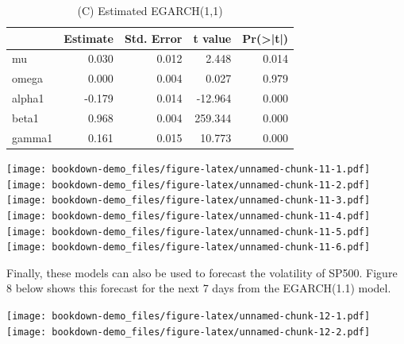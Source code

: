 \documentclass[]{book}
\theoremstyle{definition}
\theoremstyle{definition}
\theoremstyle{definition}
\theoremstyle{remark}
\begin{document}
\begin{table}

\caption{\label{tab:unnamed-chunk-11}(C) Estimated EGARCH(1,1)}
\centering
\begin{tabular}[t]{l|r|r|r|r}
\hline
  &  Estimate &  Std. Error &  t value & Pr(>|t|)\\
\hline
mu & 0.030 & 0.012 & 2.448 & 0.014\\
\hline
omega & 0.000 & 0.004 & 0.027 & 0.979\\
\hline
alpha1 & -0.179 & 0.014 & -12.964 & 0.000\\
\hline
beta1 & 0.968 & 0.004 & 259.344 & 0.000\\
\hline
gamma1 & 0.161 & 0.015 & 10.773 & 0.000\\
\hline
\end{tabular}
\end{table}

\texttt{[image: bookdown-demo\_files/figure-latex/unnamed-chunk-11-1.pdf]}
\texttt{[image: bookdown-demo\_files/figure-latex/unnamed-chunk-11-2.pdf]}
\texttt{[image: bookdown-demo\_files/figure-latex/unnamed-chunk-11-3.pdf]}
\texttt{[image: bookdown-demo\_files/figure-latex/unnamed-chunk-11-4.pdf]}
\texttt{[image: bookdown-demo\_files/figure-latex/unnamed-chunk-11-5.pdf]}
\texttt{[image: bookdown-demo\_files/figure-latex/unnamed-chunk-11-6.pdf]}

Finally, these models can also be used to forecast the volatility of
SP500. Figure 8 below shows this forecast for the next 7 days from the
EGARCH(1.1) model.

\texttt{[image: bookdown-demo\_files/figure-latex/unnamed-chunk-12-1.pdf]}
\texttt{[image: bookdown-demo\_files/figure-latex/unnamed-chunk-12-2.pdf]}


\end{document}

